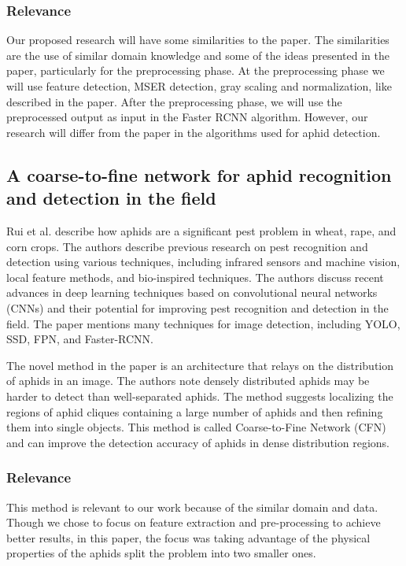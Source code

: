 \documentclass{article}
\begin{document}
\subsubsection*{Relevance}
Our proposed research will have some similarities to the paper. The similarities are the use of similar domain
knowledge and some of the ideas presented in the paper,
particularly for the preprocessing phase. At the preprocessing phase we will use feature detection, MSER detection,
gray scaling and normalization, like described in the paper. After the preprocessing phase,
we will use the preprocessed output as input in the Faster RCNN algorithm. However,
our research will differ from the paper in the algorithms used for aphid detection.


\subsection*{A coarse-to-fine network for aphid recognition and detection in the field \cite{CoarseToFine}}

Rui et al. describe how aphids are a significant pest problem in wheat, rape, and corn crops.
The authors describe previous research on pest recognition and detection using various techniques,
including infrared sensors and machine vision, local feature methods, and bio-inspired techniques.
The authors discuss recent advances in deep learning techniques based on convolutional neural networks (CNNs)
and their potential for improving pest recognition and detection in the field. The paper mentions many techniques
for image detection, including YOLO, SSD, FPN, and Faster-RCNN.

The novel method in the paper is an architecture that relays on the distribution of aphids in an image.
The authors note densely distributed aphids may be harder to detect than well-separated aphids.
The method suggests localizing the regions of aphid cliques containing a large number of aphids and
then refining them into single objects. This method is called Coarse-to-Fine Network (CFN)
and can improve the detection accuracy of aphids in dense distribution regions.

\subsubsection*{Relevance}
This method is relevant to our work because of the similar domain and data.
Though we chose to focus on feature extraction and pre-processing to achieve better results,
in this paper, the focus was taking advantage of the physical properties of the aphids split the
problem into two smaller ones.
\end{document}
